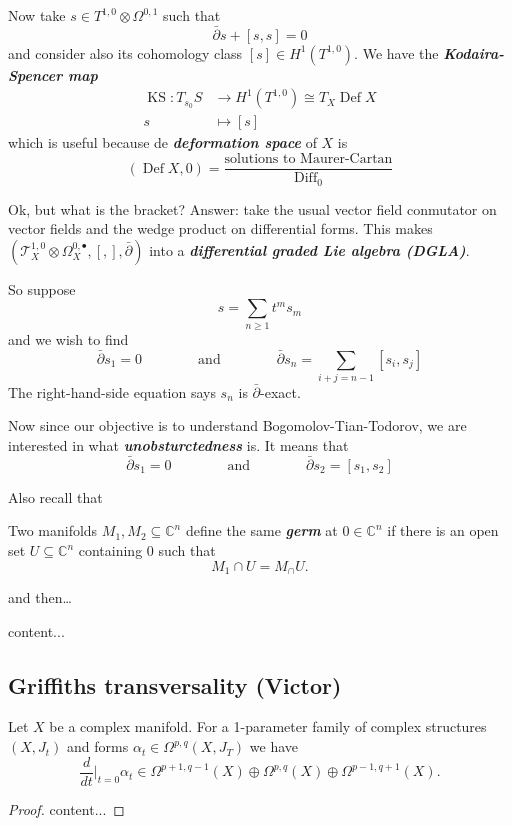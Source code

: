 \documentclass{article}
\numberwithin{equation}{section}
\newcommand{\C}{\mathbb{C}}
\newcommand{\Tc}{\mathcal{T}}
\DeclareMathOperator{\Def}{Def}
\DeclareMathOperator{\Diff}{Diff}
\renewcommand{\Def}{\operatorname{Def}}
\begin{document}
\vspace{2em}
Now take $s\in T^{1,0}\otimes\Omega^{0,1}$ such that
\[\bar\partial s+[s,s]=0\]
and consider also its cohomology class $[s]\in H^1(T^{1,0})$. We have the \textbf{\textit{Kodaira-Spencer map}}
\begin{align*}
	\operatorname{KS}:T_{s_0}S&\to H^1(T^{1,0})\cong T_X\Def X\\
	s&\mapsto [s]
\end{align*}
which is useful because de \textbf{\textit{deformation space}} of $X$ is
\[(\Def X,0)=\frac{\text{solutions to Maurer-Cartan}}{\Diff_0}\]

Ok, but what is the bracket? Answer: take the usual vector field conmutator on vector fields and the wedge product on differential forms. This makes $(\Tc^{1,0}_X\otimes \Omega^{0,\bullet}_X,[,],\bar\partial)$ into a \textbf{\textit{differential graded Lie algebra (DGLA)}}.

So suppose
\[s=\sum_{n\geq1}t^ms_m\]
and we wish to find
\[\bar\partial s_1=0\qquad\qquad\text{and}\qquad\qquad \bar\partial s_n=\sum_{i+j=n-1}[s_i,s_j]\]
The right-hand-side equation says $s_n$ is $\bar\partial$-exact.

Now since our objective is to understand Bogomolov-Tian-Todorov, we are interested in what \textbf{\textit{unobsturctedness}} is. It means that
\[\bar\partial s_1=0\qquad\qquad\text{and}\qquad\qquad\bar\partial s_2=[s_1,s_2]\]

Also recall that
\begin{defn}
	Two manifolds $M_1,M_2\subseteq\C^n$ define the same \textbf{\textit{germ}} at $0\in\C^n$ if there is an open set $U\subseteq \C^n$ containing $0$ such that
	\[M_1\cap U=M_\cap U.\]
\end{defn}
and then…
\begin{thm}
	content...
\end{thm}

\subsection{Griffiths transversality (Victor)}
\begin{claim}
	Let $X$ be a complex manifold. For a 1-parameter family of complex structures $(X,J_t)$ and forms $\alpha_t\in\Omega^{p,q}(X,J_T)$ we have
\[\frac{d}{dt}\Big|_{t=0}\alpha_t\in\Omega^{p+1,q-1}(X)\oplus\Omega^{p,q}(X)\oplus\Omega^{p-1,q+1}(X).\]
\end{claim}
\begin{proof}
	{\color{magenta}content...}
\end{proof}
\end{document}

